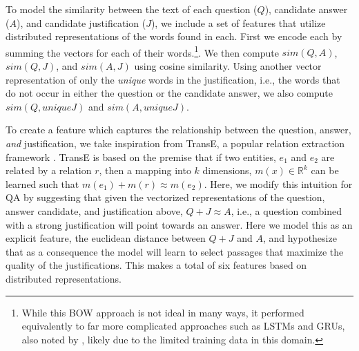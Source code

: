 { } To model the similarity between the text of each question ($Q$), candidate answer ($A$), and candidate justification ($J$), we include a set of features that utilize distributed representations of the words found in each.
First we encode each 
by summing the vectors for each of their words.\footnote{While this BOW approach is not ideal in many ways, it performed equivalently to far more complicated approaches such as LSTMs and GRUs, also noted by \cite{Iyyer2015}, likely due to the limited training data in this domain.}.  We then compute $sim(Q, A)$, $sim(Q, J)$, and $sim(A, J)$ using cosine similarity.  Using another vector representation of only the \emph{unique} words in the justification, i.e., the words that do not occur in either the question or the candidate answer, we also compute $sim(Q, uniqueJ)$ and $sim(A, uniqueJ)$.  

To create a feature which captures the relationship between the question, answer, \emph{and} justification, we take inspiration from TransE, a popular relation extraction framework \citep{Bordes2013TranslatingEF}.  TransE is based on the premise that if two entities, $e_1$ and $e_2$ are related by a relation $r$, then a mapping into $k$ dimensions, $m(x) \in \mathbb{R}^k$ can be learned such that $m(e_1) + m(r) \approx m(e_2)$.  Here, we modify this intuition for QA by suggesting that given the vectorized representations of the question, answer candidate, and justification above, $Q + J \approx A$, i.e., a question combined with a strong justification will point towards an answer.  Here we model this as an explicit feature, the euclidean distance between $Q + J$ and $A$, and hypothesize that as a consequence the model will learn to select passages that maximize the quality of the justifications.
This makes a total of six features based on distributed representations. %

